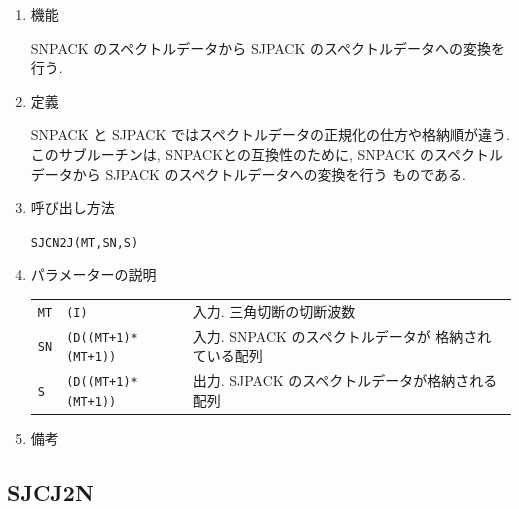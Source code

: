 \documentclass[a4j]{jarticle}
\begin{document}
\begin{enumerate}

\item 機能 

SNPACK のスペクトルデータから SJPACK のスペクトルデータへの変換を行う.

\item 定義

SNPACK と SJPACK ではスペクトルデータの正規化の仕方や格納順が違う.
このサブルーチンは, SNPACKとの互換性のために,
SNPACK のスペクトルデータから SJPACK のスペクトルデータへの変換を行う
ものである.

\item 呼び出し方法 

{\tt SJCN2J(MT,SN,S)}
  
\item パラメーターの説明

\begin{tabular}{lll}
{\tt MT} & {\tt (I)} & 入力. 三角切断の切断波数\\
{\tt SN} & {\tt (D((MT+1)*(MT+1))} & 入力. SNPACK のスペクトルデータが
格納されている配列\\
{\tt S} & {\tt (D((MT+1)*(MT+1))} & 出力. 
SJPACK のスペクトルデータが格納される配列
\end{tabular}

\item 備考

\end{enumerate}


\subsection{SJCJ2N}
\end{document}

